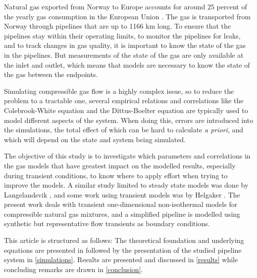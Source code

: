 Natural gas exported from Norway to Europe accounts for around 25 percent of the yearly gas consumption in the European Union%
. The gas is transported from Norway through pipelines that are up to 1166 km long. %
To ensure that the pipelines stay within their operating limits, to monitor the pipelines for leaks, and to track changes in gas quality, %
it is important to know the state of the gas in the pipelines. %
But measurements of the state of the gas are only available at the inlet and outlet, which means that  models are necessary to know the state of the gas between the endpoints. 

Simulating compressible gas flow is a highly complex issue, so to reduce the problem to a tractable one, several empirical relations and correlations like the Colebrook-White equation and the Dittus-Boelter equation are typically used to model different aspects of the system. When doing this, errors are introduced into the simulations, the total effect of which can be hard to calculate \emph{a priori}, and which will depend on the state and system being simulated. 

The objective of this study is to investigate which parameters and correlations in the gas models that have greatest impact on the modelled results, especially during transient conditions, to know where to apply effort when trying to improve the models. A similar study limited to steady state models was done by Langelandsvik \cite{Langelandsvik2008Modeling}, and some work using transient models was by Helgaker \cite{Helgaker2013Modeling}. The present work deals with transient one-dimensional non-isothermal models for compressible natural gas mixtures, and a simplified pipeline is modelled using synthetic but representative flow transients as boundary conditions.

This article is structured as follows: The theoretical foundation and underlying equations are presented in 
followed by the presentation of the studied pipeline system in \cref{simulations}. Results are presented and discussed in \cref{results} while concluding remarks are drawn in \cref{conclusion}.